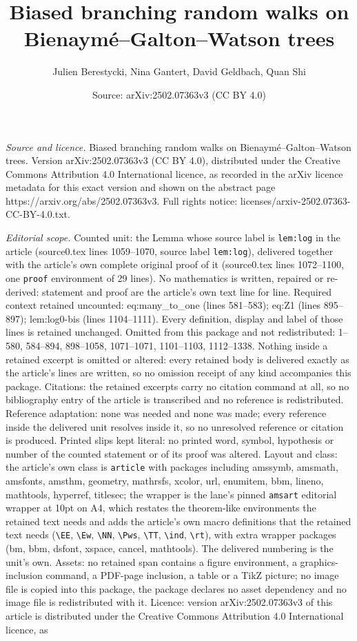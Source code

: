 \documentclass[10pt,a4paper]{amsart}
\title[Biased branching random walks on Bienaym\'e--Galton--Watson ]{Biased branching random walks on Bienaym\'e--Galton--Watson trees}
\author{Julien Berestycki, Nina Gantert, David Geldbach, Quan Shi}
\date{Source: arXiv:2502.07363v3 (CC BY 4.0)}
\begin{document}
\maketitle

\noindent\emph{Source and licence.} Biased branching random walks on Bienaym\'e--Galton--Watson trees. Version arXiv:2502.07363v3 (CC BY 4.0), distributed under the Creative Commons Attribution 4.0 International licence, as recorded in the arXiv licence metadata for this exact version and shown on the abstract page https://arxiv.org/abs/2502.07363v3. Full rights notice: licenses/arxiv-2502.07363-CC-BY-4.0.txt.\par\smallskip

\noindent\textit{Editorial scope.} Counted unit: the Lemma whose source label is \texttt{lem:log} in the article (source0.tex lines 1059--1070, source label \texttt{lem:log}), delivered together with the article's own complete original proof of it (source0.tex lines 1072--1100, one \texttt{proof} environment of 29 lines). No mathematics is written, repaired or re-derived: statement and proof are the article's own text line for line. Required context retained uncounted: eq:many\_to\_one (lines 581--583); eq:Z1 (lines 895--897); lem:log0-bis (lines 1104--1111). Every definition, display and label of those lines is retained unchanged. Omitted from this package and not redistributed: 1--580, 584--894, 898--1058, 1071--1071, 1101--1103, 1112--1338. Nothing inside a retained excerpt is omitted or altered: every retained body is delivered exactly as the article's lines are written, so no omission receipt of any kind accompanies this package. Citations: the retained excerpts carry no citation command at all, so no bibliography entry of the article is transcribed and no reference is redistributed. Reference adaptation: none was needed and none was made; every reference inside the delivered unit resolves inside it, so no unresolved reference or citation is produced. Printed slips kept literal: no printed word, symbol, hypothesis or number of the counted statement or of its proof was altered. Layout and class: the article's own class is \texttt{article} with packages including amssymb, amsmath, amsfonts, amsthm, geometry, mathrsfs, xcolor, url, enumitem, bbm, lineno, mathtools, hyperref, titlesec; the wrapper is the lane's pinned \texttt{amsart} editorial wrapper at 10pt on A4, which restates the theorem-like environments the retained text needs and adds the article's own macro definitions that the retained text needs (\texttt{\textbackslash EE}, \texttt{\textbackslash Ew}, \texttt{\textbackslash NN}, \texttt{\textbackslash Pws}, \texttt{\textbackslash TT}, \texttt{\textbackslash ind}, \texttt{\textbackslash rt}), with extra wrapper packages (bm, bbm, dsfont, xspace, cancel, mathtools). The delivered numbering is the unit's own. Assets: no retained span contains a figure environment, a graphics-inclusion command, a PDF-page inclusion, a table or a TikZ picture; no image file is copied into this package, the package declares no asset dependency and no image file is redistributed with it. Licence: version arXiv:2502.07363v3 of this article is distributed under the Creative Commons Attribution 4.0 International licence, as 
\end{document}
